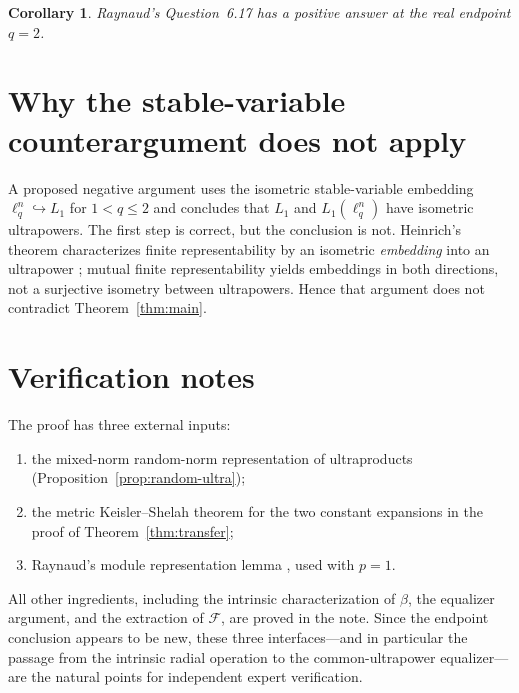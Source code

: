 \documentclass[11pt]{article}
\newcommand{\1}{\mathbf 1}
\newtheorem{corollary}[theorem]{Corollary}
\theoremstyle{definition}
\theoremstyle{remark}
\begin{document}
\begin{corollary}
Raynaud's Question~6.17 has a positive answer at the real endpoint $q=2$.
\end{corollary}


\section{Why the stable-variable counterargument does not apply}

A proposed negative argument uses the isometric stable-variable embedding
$\ell_q^n\hookrightarrow L_1$ for $1<q\leq2$ and concludes that
$L_1$ and $L_1(\ell_q^n)$ have isometric ultrapowers.  The first step is
correct, but the conclusion is not.  Heinrich's theorem characterizes finite
representability by an isometric \emph{embedding} into an ultrapower
\cite{Heinrich1980}; mutual finite representability yields embeddings in both
directions, not a surjective isometry between ultrapowers.  Hence that
argument does not contradict Theorem~\ref{thm:main}.

\section*{Verification notes}

The proof has three external inputs:
\begin{enumerate}[leftmargin=2.2em]
\item the mixed-norm random-norm representation of ultraproducts
      (Proposition~\ref{prop:random-ultra});
\item the metric Keisler--Shelah theorem for the two constant expansions
      in the proof of Theorem~\ref{thm:transfer};
\item Raynaud's module representation lemma
      \cite[Lemma~4.4]{Raynaud2004}, used with $p=1$.
\end{enumerate}
All other ingredients, including the intrinsic characterization of $\beta$,
the equalizer argument, and the extraction of $\mathcal F$, are proved in
the note.  Since the endpoint conclusion appears to be new, these three interfaces---and
in particular the passage from the intrinsic radial operation to the
common-ultrapower equalizer---are the natural points for independent expert
verification.
\end{document}
